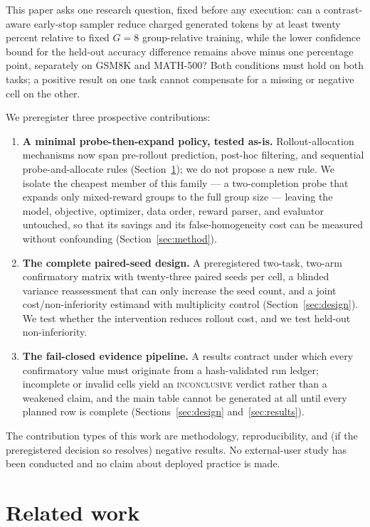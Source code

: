 \documentclass[11pt]{article}
\begin{document}
This paper asks one research question, fixed before any execution: can a contrast-aware early-stop sampler reduce charged generated tokens by at least twenty percent relative to fixed $G{=}8$ group-relative training, while the lower confidence bound for the held-out accuracy difference remains above minus one percentage point, separately on GSM8K and MATH-500? Both conditions must hold on both tasks; a positive result on one task cannot compensate for a missing or negative cell on the other.

We preregister three prospective contributions:
\begin{enumerate}
  \item \textbf{A minimal probe-then-expand policy, tested as-is.} Rollout-allocation mechanisms now span pre-rollout prediction, post-hoc filtering, and sequential probe-and-allocate rules (Section~\ref{sec:related}); we do not propose a new rule. We isolate the cheapest member of this family --- a two-completion probe that expands only mixed-reward groups to the full group size --- leaving the model, objective, optimizer, data order, reward parser, and evaluator untouched, so that its savings and its false-homogeneity cost can be measured without confounding (Section~\ref{sec:method}).
  \item \textbf{The complete paired-seed design.} A preregistered two-task, two-arm confirmatory matrix with twenty-three paired seeds per cell, a blinded variance reassessment that can only increase the seed count, and a joint cost/non-inferiority estimand with multiplicity control (Section~\ref{sec:design}). We test whether the intervention reduces rollout cost, and we test held-out non-inferiority.
  \item \textbf{The fail-closed evidence pipeline.} A results contract under which every confirmatory value must originate from a hash-validated run ledger; incomplete or invalid cells yield an \textsc{inconclusive} verdict rather than a weakened claim, and the main table cannot be generated at all until every planned row is complete (Sections~\ref{sec:design} and~\ref{sec:results}).
\end{enumerate}

The contribution types of this work are methodology, reproducibility, and (if the preregistered decision so resolves) negative results. No external-user study has been conducted and no claim about deployed practice is made.

\section{Related work}
\label{sec:related}
\end{document}
